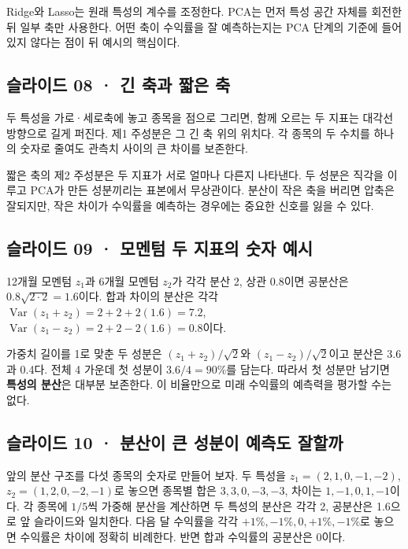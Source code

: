 \documentclass[11pt,a4paper]{article}
\begin{document}
Ridge와 Lasso는 원래 특성의 계수를 조정한다. PCA는 먼저 특성 공간 자체를 회전한 뒤 일부 축만 사용한다. 어떤 축이 수익률을 잘 예측하는지는 PCA 단계의 기준에 들어 있지 않다는 점이 뒤 예시의 핵심이다.\par

\subsection{슬라이드 08 · 긴 축과 짧은 축}
두 특성을 가로·세로축에 놓고 종목을 점으로 그리면, 함께 오르는 두 지표는 대각선 방향으로 길게 퍼진다. 제1 주성분은 그 긴 축 위의 위치다. 각 종목의 두 수치를 하나의 숫자로 줄여도 관측치 사이의 큰 차이를 보존한다.\par

짧은 축의 제2 주성분은 두 지표가 서로 얼마나 다른지 나타낸다. 두 성분은 직각을 이루고 PCA가 만든 성분끼리는 표본에서 무상관이다. 분산이 작은 축을 버리면 압축은 잘되지만, 작은 차이가 수익률을 예측하는 경우에는 중요한 신호를 잃을 수 있다.\par

\subsection{슬라이드 09 · 모멘텀 두 지표의 숫자 예시}
12개월 모멘텀 $z_1$과 6개월 모멘텀 $z_2$가 각각 분산 2, 상관 0.8이면 공분산은 $0.8\sqrt{2\cdot2}=1.6$이다. 합과 차이의 분산은 각각 $\operatorname{Var}(z_1+z_2)=2+2+2(1.6)=7.2$, $\operatorname{Var}(z_1-z_2)=2+2-2(1.6)=0.8$이다.\par

가중치 길이를 1로 맞춘 두 성분은 $(z_1+z_2)/\sqrt2$와 $(z_1-z_2)/\sqrt2$이고 분산은 3.6과 0.4다. 전체 4 가운데 첫 성분이 $3.6/4=90\%$를 담는다. 따라서 첫 성분만 남기면 \textbf{특성의 분산}은 대부분 보존한다. 이 비율만으로 미래 수익률의 예측력을 평가할 수는 없다.\par

\subsection{슬라이드 10 · 분산이 큰 성분이 예측도 잘할까}
앞의 분산 구조를 다섯 종목의 숫자로 만들어 보자. 두 특성을 $z_1=(2,1,0,-1,-2)$, $z_2=(1,2,0,-2,-1)$로 놓으면 종목별 합은 $3,3,0,-3,-3$, 차이는 $1,-1,0,1,-1$이다. 각 종목에 $1/5$씩 가중해 분산을 계산하면 두 특성의 분산은 각각 2, 공분산은 1.6으로 앞 슬라이드와 일치한다. 다음 달 수익률을 각각 $+1\%,-1\%,0,+1\%,-1\%$로 놓으면 수익률은 차이에 정확히 비례한다. 반면 합과 수익률의 공분산은 0이다.\par
\end{document}
